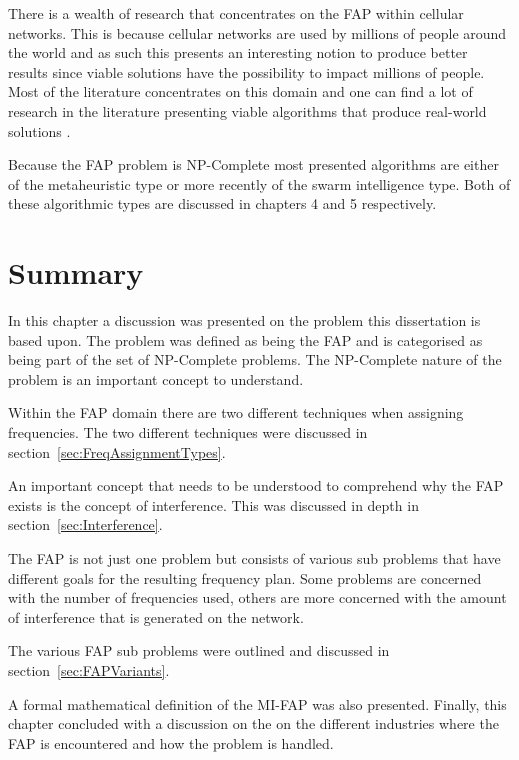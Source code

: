 There is a wealth of research that concentrates on the \gls{FAP} within cellular networks. This is because cellular networks are used by millions of people around the world and as such this presents an interesting notion to produce better results since viable solutions have the possibility to impact millions of people. Most of the literature concentrates on this domain and one can find a lot of research in the literature presenting viable algorithms that produce real-world solutions \cite{Eisenblatter}. 

Because the \gls{FAP} problem is NP-Complete most presented algorithms are either of the metaheuristic type or more recently of the swarm intelligence type. Both of these algorithmic types are discussed in chapters 4 and 5 respectively.
\section{Summary}
In this chapter a discussion was presented on the problem this dissertation is based upon. The problem was defined as being the \gls{FAP} and is categorised as being part of the set of NP-Complete problems. The NP-Complete nature of the problem is an important concept to understand.

Within the \gls{FAP} domain there are two different techniques when assigning frequencies. The two different techniques were discussed in section~\ref{sec:FreqAssignmentTypes}. 

An important concept that needs to be understood to comprehend why the \gls{FAP} exists is the concept of interference. This was discussed in depth in section~\ref{sec:Interference}.

The \gls{FAP} is not just one problem but consists of various sub problems that have different goals for the resulting frequency plan. Some problems are concerned with the number of frequencies used, others are more concerned with the amount of interference that is generated on the network.

The various \gls{FAP} sub problems were outlined and discussed in section~\ref{sec:FAPVariants}.

A formal mathematical definition of the \gls{MI-FAP} was also presented. Finally, this chapter concluded with a discussion on the on the different industries where the FAP is encountered and how the problem is handled.
